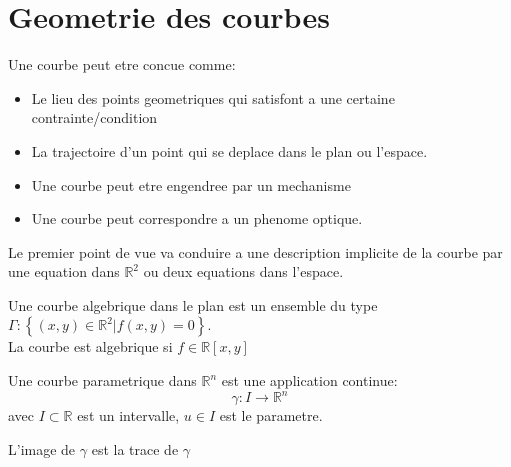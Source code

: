\documentclass[../main.tex]{subfiles}
\begin{document}
\section{Geometrie des courbes}
Une courbe peut etre concue comme:
\begin{itemize}
\item Le lieu des points geometriques qui satisfont a une certaine contrainte/condition
\item La trajectoire d'un point qui se deplace dans le plan ou l'espace.
\item Une courbe peut etre engendree par un mechanisme
\item Une courbe peut correspondre a un phenome optique.
\end{itemize}
Le premier point de vue va conduire a une description implicite de la courbe par une equation dans $\mathbb{R}^{2}$ ou deux equations dans l'espace.
\begin{defn}
	Une courbe algebrique dans le plan est un ensemble du type $ \Gamma: \left\{ ( x,y) \in \mathbb{R}^{2}| f( x,y) =0 \right\} $.\\
	La courbe est algebrique si $f\in \mathbb{R}[x,y]$ 
	
\end{defn}
\begin{defn}
	Une courbe parametrique dans $ \mathbb{R}^n$ est une application continue:
	\[ 
	\gamma: I \to \mathbb{R}^{n}
	\]
	avec $I \subset \mathbb{R}$ est un intervalle, $u\in I$ est le parametre.\\
\end{defn}	
	L'image de $\gamma$ est la trace de $\gamma$ 
\end{document}
